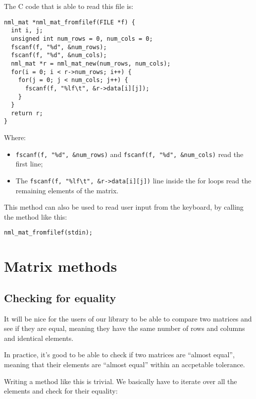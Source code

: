 The C code that is able to read this file is:

\begin{verbatim}
nml_mat *nml_mat_fromfilef(FILE *f) {
  int i, j;
  unsigned int num_rows = 0, num_cols = 0;
  fscanf(f, "%d", &num_rows);
  fscanf(f, "%d", &num_cols);
  nml_mat *r = nml_mat_new(num_rows, num_cols);
  for(i = 0; i < r->num_rows; i++) {
    for(j = 0; j < num_cols; j++) {
      fscanf(f, "%lf\t", &r->data[i][j]);
    }
  }
  return r;
} 
\end{verbatim}

Where:

\begin{itemize}
\item {\tt fscanf(f, "\%d", \&num\_rows)} 
and {\tt fscanf(f, "\%d", \&num\_cols)} read the first line;
\item The {\tt fscanf(f, "\%lf\textbackslash t", \&r->data[i][j])} line inside the for loops read the remaining elements of the matrix.
\end{itemize}

This method can also be used to read user input from the keyboard, by calling the method like this:

\begin{verbatim}
nml_mat_fromfilef(stdin);
\end{verbatim}

\section{Matrix methods}

\subsection{Checking for equality}

It will be nice for the users of our library to be able to compare two matrices and see if they are equal, meaning they have the same number of rows and columns and identical elements.

In practice, it’s good to be able to check if two matrices are ``almost equal'', meaning that their elements are ``almost equal'' within an accpetable tolerance.

Writing a method like this is trivial. We basically have to iterate over all the elements and check for their equality:


